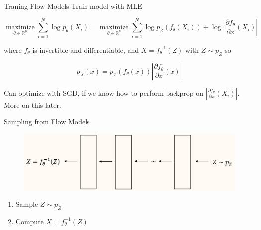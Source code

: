 \begin{frame}[allowframebreaks]

\begin{mydefinitionblock}{10.7}{Traning Flow Models}
    Train model with MLE

    $$
    \underset{\theta \in \mathbb{R}^{p}}{\operatorname{maximize}} \sum_{i=1}^{N} \log p_{\theta}\left(X_{i}\right)=\underset{\theta \in \mathbb{R}^{p}}{\operatorname{maximize}} \sum_{i=1}^{N} \log p_{Z}\left(f_{\theta}\left(X_{i}\right)\right)+\log \left|\frac{\partial f_{\theta}}{\partial x}\left(X_{i}\right)\right|
    $$

    where $f_{\theta}$ is invertible and differentiable, and $X=f_{\theta}^{-1}(Z)$ with $Z \sim p_{Z}$ so

    $$
    p_{X}(x)=p_{Z}\left(f_{\theta}(x)\right)\left|\frac{\partial f_{\theta}}{\partial x}(x)\right|
    $$

    Can optimize with SGD, if we know how to perform backprop on $\left|\frac{\partial f_{\theta}}{\partial x}\left(X_{i}\right)\right|$. More on this later.
\end{mydefinitionblock}

\end{frame}

\begin{frame}[allowframebreaks]

\begin{mydefinitionblock}{10.8}{Sampling from Flow Models}
    \begin{figure}[H]
        \centering
        \includegraphics[width=1.0\textwidth]{.././assets/10.7.png}
    \end{figure}

    \begin{enumerate}
        \item Sample $Z \sim p_{Z}$
        \item Compute $X=f_{\theta}^{-1}(Z)$
    \end{enumerate}
\end{mydefinitionblock}

\end{frame}

